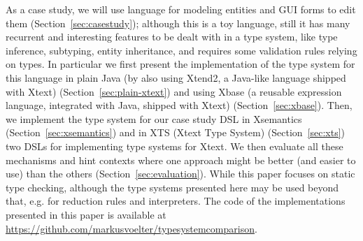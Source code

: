 As a case study, we will use language for modeling entities and GUI forms to
edit them (Section~\ref{sec:casestudy}); although this is a toy language, still
it has many recurrent and interesting features to be dealt with in a type
system, like type inference, subtyping, entity inheritance, and requires some
validation rules relying on types.  In particular we first present the
implementation of the type system for this language in plain Java (by also using
Xtend2, a Java-like language shipped with Xtext) (Section~\ref{sec:plain-xtext})
and using Xbase (a reusable expression language, integrated with Java, shipped
with Xtext) (Section~\ref{sec:xbase}).
Then, we implement the type system for our case study DSL in Xsemantics
(Section~\ref{sec:xsemantics}) and in XTS (Xtext Type System)
(Section~\ref{sec:xts}) two DSLs for implementing type systems for Xtext.
We then evaluate all these mechanisms and hint contexts where one approach
might be better (and easier to use) than the others
(Section~\ref{sec:evaluation}).
While this paper focuses on static type checking, although the type systems
presented here may be used beyond that, e.g. for reduction rules and
interpreters.  The code of the implementations presented in this paper is
available at \url{https://github.com/markusvoelter/typesystemcomparison}.


